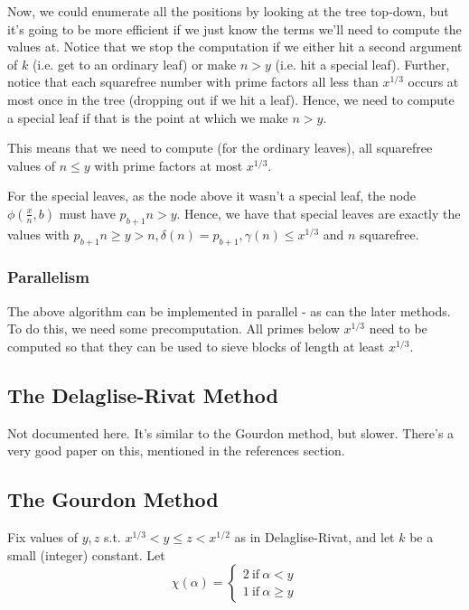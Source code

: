 \documentclass[12pt]{article}
\begin{document}
Now, we could enumerate all the positions by looking at the tree top-down, but it's going to be more efficient if we just know the terms
we'll need to compute the values at. Notice that we stop the computation if we either hit a second argument of $k$ (i.e. get to an ordinary leaf)
or make $n>y$ (i.e. hit a special leaf). Further, notice that each squarefree number with prime factors all less than $x^{1/3}$ occurs at most
once in the tree (dropping out if we hit a leaf). Hence, we need to compute a special leaf if that is the point at which we make $n>y$. 

This means that we need to compute (for the ordinary leaves), all squarefree values of $n\leq y$ with prime factors at most $x^{1/3}$.

For the special leaves, as the node above it wasn't a special leaf, the node $\phi\left(\frac{x}{n}, b\right)$ must have $p_{b+1}n > y$.
Hence, we have that special leaves are exactly the values with $p_{b+1}n \geq y > n, \delta(n) = p_{b+1}, \gamma(n) \leq x^{1/3}$
and $n$ squarefree.

\subsubsection{Parallelism}
The above algorithm can be implemented in parallel - as can the later methods. To do this, we need some precomputation. All primes below $x^{1/3}$
need to be computed so that they can be used to sieve blocks of length at least $x^{1/3}$.

\subsection{The Delaglise-Rivat Method}
Not documented here. It's similar to the Gourdon method, but slower. There's a very good paper on this, mentioned in the references section.

\subsection{The Gourdon Method}
Fix values of $y,z$ s.t. $x^{1/3} < y \leq z < x^{1/2}$ as in Delaglise-Rivat, and let $k$ be a small (integer) constant. Let
\begin{equation*}
  \chi(\alpha) =
    \begin{cases}
      2\ \mathrm{if}\ \alpha < y\\
      1\ \mathrm{if}\ \alpha \geq y
    \end{cases}
\end{equation*}
\end{document}
